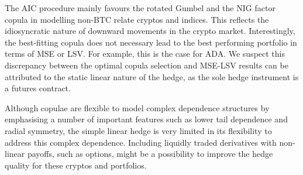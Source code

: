 The AIC procedure mainly favours the rotated Gumbel and the NIG
factor copula in modelling non-BTC relate cryptos and indices. This
reflects the idiosyncratic nature of 
downward movements in the crypto market. Interestingly, the best-fitting
copula does not necessary lead to the best performing portfolio in
terms of MSE or LSV. For example, this is the case for ADA.
We suspect this discrepancy between the optimal copula selection and
MSE-LSV results can be attributed to the static linear nature of the
hedge, as the sole hedge instrument is a futures contract. 

Although copulae are flexible to model complex dependence structures
by emphasising a number of important features such as lower tail
dependence and radial symmetry, the simple linear hedge is very
limited in its flexibility to address this complex dependence.
Including liquidly traded derivatives with non-linear payoffs, such as
options, might be a possibility to improve the hedge quality for these
cryptos and portfolios. 




